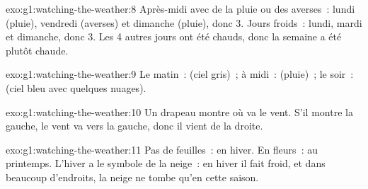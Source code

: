 \begin{solution}{exo:g1:watching-the-weather:8}
Après-midi avec de la pluie ou des averses~: lundi (pluie), vendredi (averses) et dimanche
(pluie), donc 3. Jours froids~: lundi, mardi et dimanche, donc 3. Les
4 autres jours ont été chauds, donc la semaine a été plutôt chaude.
\end{solution}

\begin{solution}{exo:g1:watching-the-weather:9}
Le matin~:  (ciel gris)~; à midi~:  (pluie)~;
le soir~:  (ciel bleu avec quelques nuages).
\end{solution}

\begin{solution}{exo:g1:watching-the-weather:10}
Un drapeau montre où va le vent. S'il montre la gauche, le vent va vers la
gauche, donc il vient de la droite.
\end{solution}

\begin{solution}{exo:g1:watching-the-weather:11}
Pas de feuilles~: en hiver. En fleurs~: au printemps. L'hiver a le symbole
de la neige~: en hiver il fait froid, et dans beaucoup d'endroits, la neige
ne tombe qu'en cette saison.
\end{solution}
